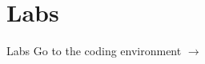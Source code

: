 \documentclass{beamer}\usepackage[]{graphicx}\usepackage[]{xcolor}
\begin{document}
\section{Labs}
\begin{frame}{Labs}
    \alert{{\Large Go to the coding environment $\rightarrow$}}
\end{frame}
\end{document}
